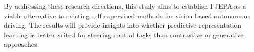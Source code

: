 \documentclass{article}
\begin{document}
By addressing these research directions, this study aims to establish I-JEPA as a viable alternative to existing self-supervised methods for vision-based autonomous driving. The results will provide insights into whether predictive representation learning is better suited for steering control tasks than contrastive or generative approaches.



\end{document}
